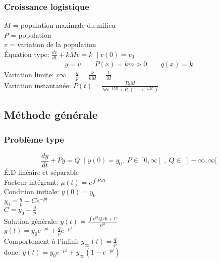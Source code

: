 \subsubsection*{Croissance logistique}
$M$ = population maximale du milieu\\
$P$ = population\\
$v$ = variation de la population\\
Équation type: \(\frac{dv}{dt}+kMv=k \;\mid v(0)=v_0\)
\begin{gather*}
 y=v \qquad    P(x)=km>0 \qquad q(x)=k
\end{gather*}
Variation limite: \(v\infty=\frac{q}{p}=\frac{k}{kM}=\frac{1}{M}\)\\
Variation instantanée: \(P(t)=\frac{P_0 M}{M e^{-kMt}+P_0 (1-e^{- k M t})}\)\\

\subsection*{Méthode générale}
\subsubsection*{Problème type}
\[\frac{dy}{dt}+Py=Q \;\mid y(0)=y_0, \;P \in\; ] 0,\infty[\;,\; Q \in\; ]-\infty,\infty[\]
É.D linéaire et séparable\\
Facteur intégrant: \(\mu(t)=e^{\int P\:dt}\)\\
Condition initiale: \(y(0)=y_0\)\\
\(y_0=\frac{q}{p}+Ce^{-pt}\)\\
\(C=y_0-\frac{q}{p}\)\\
Solution générale: \(y(t)=\frac{\int e^{pt} Q \:dt+C}{e^{pt}}\)\\
\(y(t)=y_0e^{-pt}+\frac{q}{p}e^{-pt}\)\\
Comportement à l'infini: \(y_\infty(t)=\frac{q}{p}\)\\
donc: \(y(t)=y_0e^{-pt}+y_\infty(1-e^{-pt})\)


